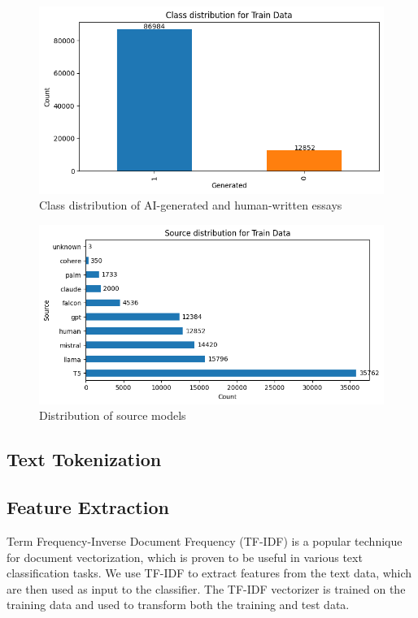 \documentclass[conference]{IEEEtran}
\begin{document}
\begin{figure}[htbp]
  \centerline{\includegraphics[width=\columnwidth]{figs/class_dist.png}}
  \caption{Class distribution of AI-generated and human-written essays}
  \label{fig:class_dist}
\end{figure}

\begin{figure}[htbp]
  \centerline{\includegraphics[width=\columnwidth]{figs/source_dist.png}}
  \caption{Distribution of source models}
  \label{fig:source_dist}
\end{figure}

\subsection{Text Tokenization}

\subsection{Feature Extraction}


Term Frequency-Inverse Document Frequency (TF-IDF) is a popular technique for document vectorization, which is proven to be useful in various text classification tasks. We use TF-IDF to extract features from the text data, which are then used as input to the classifier. The TF-IDF vectorizer is trained on the training data and used to transform both the training and test data.
\end{document}
